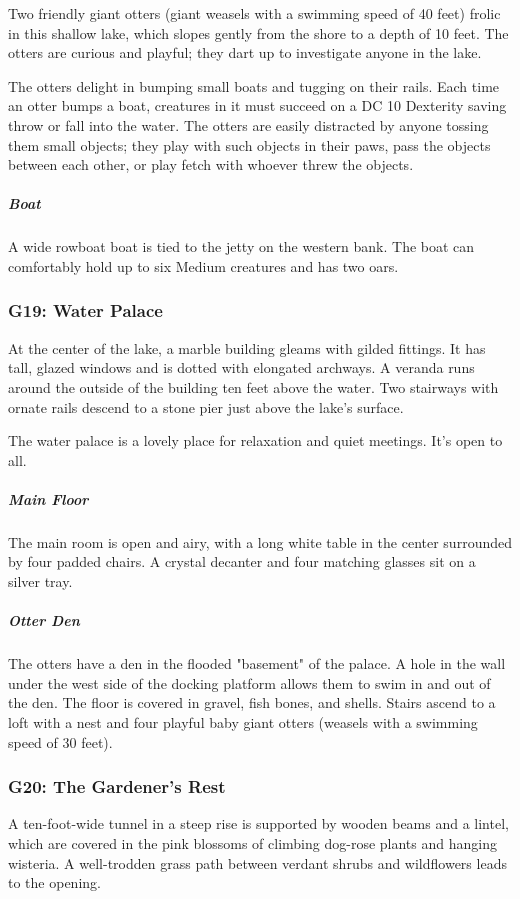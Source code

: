 \documentclass[10pt,a4paper,twoside,bg=print,twocolumn,openany,nodeprecatedcode]{dndbook}
\begin{document}
Two friendly giant otters (giant weasels with a swimming speed of 40 feet) frolic in this shallow lake, which slopes gently from the shore to a depth of 10 feet. The otters are curious and playful; they dart up to investigate anyone in the lake.

The otters delight in bumping small boats and tugging on their rails. Each time an otter bumps a boat, creatures in it must succeed on a DC 10 Dexterity saving throw or fall into the water. The otters are easily distracted by anyone tossing them small objects; they play with such objects in their paws, pass the objects between each other, or play fetch with whoever threw the objects.

\subparagraph{Boat}
A wide rowboat boat is tied to the jetty on the western bank. The boat can comfortably hold up to six Medium creatures and has two oars.

\subsubsection{G19: Water Palace}
\begin{DndReadAloud}{}
At the center of the lake, a marble building gleams with gilded fittings. It has tall, glazed windows and is dotted with elongated archways. A veranda runs around the outside of the building ten feet above the water. Two stairways with ornate rails descend to a stone pier just above the lake's surface.

\end{DndReadAloud}

The water palace is a lovely place for relaxation and quiet meetings. It's open to all.

\subparagraph{Main Floor}
The main room is open and airy, with a long white table in the center surrounded by four padded chairs. A crystal decanter and four matching glasses sit on a silver tray.

\subparagraph{Otter Den}
The otters have a den in the flooded "basement" of the palace. A hole in the wall under the west side of the docking platform allows them to swim in and out of the den. The floor is covered in gravel, fish bones, and shells. Stairs ascend to a loft with a nest and four playful baby giant otters (weasels with a swimming speed of 30 feet).

\subsubsection{G20: The Gardener's Rest}
\begin{DndReadAloud}{}
A ten-foot-wide tunnel in a steep rise is supported by wooden beams and a lintel, which are covered in the pink blossoms of climbing dog-rose plants and hanging wisteria. A well-trodden grass path between verdant shrubs and wildflowers leads to the opening.

\end{DndReadAloud}
\end{document}

